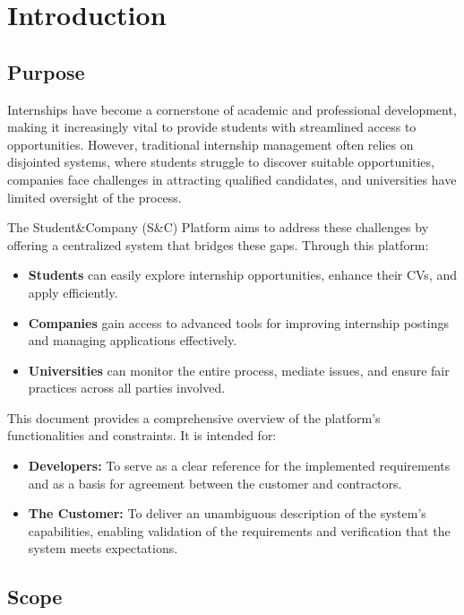 \chapter{Introduction}

\section{Purpose}
Internships have become a cornerstone of academic and professional development, making it increasingly vital to provide students with streamlined access to opportunities. However, traditional internship management often relies on disjointed systems, where students struggle to discover suitable opportunities, companies face challenges in attracting qualified candidates, and universities have limited oversight of the process.

The Student\&Company (S\&C) Platform aims to address these challenges by offering a centralized system that bridges these gaps. Through this platform:

\begin{itemize}
    \item \textbf{Students} can easily explore internship opportunities, enhance their CVs, and apply efficiently.
    \item \textbf{Companies} gain access to advanced tools for improving internship postings and managing applications effectively.
    \item \textbf{Universities} can monitor the entire process, mediate issues, and ensure fair practices across all parties involved.
\end{itemize}

This document provides a comprehensive overview of the platform's functionalities and constraints. It is intended for:

\begin{itemize}
    \item \textbf{Developers:} To serve as a clear reference for the implemented requirements and as a basis for agreement between the customer and contractors.
    \item \textbf{The Customer:} To deliver an unambiguous description of the system’s capabilities, enabling validation of the requirements and verification that the system meets expectations.
\end{itemize}


\section{Scope}

